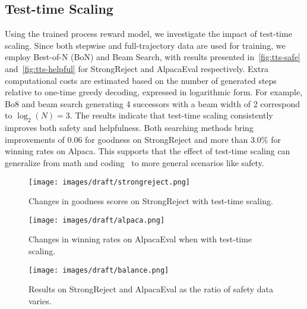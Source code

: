 \subsection{Test-time Scaling}

Using the trained process reward model, we investigate the impact of test-time scaling. Since both stepwise and full-trajectory data are used for training, we employ Best-of-N (BoN) and Beam Search, with results presented in~\cref{fig:tts-safe} and~\ref{fig:tts-helpful} for StrongReject and AlpacaEval respectively. Extra computational costs are estimated based on the number of generated steps relative to one-time greedy decoding, expressed in logarithmic form. For example, Bo8 and beam search generating 4 successors with a beam width of 2 correspond to $\log_2(N)=3$. The results indicate that test-time scaling consistently improves both safety and helpfulness. Both searching methods bring improvements of 0.06 for goodness on StrongReject and more than 3.0\% for winning rates on Alpaca.
This supports that the effect of test-time scaling can generalize from math and coding~\cite{snell2024scaling,xie2024self} to more general scenarios like safety.


\begin{figure*}[t]
     \centering
     \begin{minipage}{0.3\textwidth}
         \centering
         \texttt{[image: images/draft/strongreject.png]}
         \vspace{-4ex}
         \caption{Changes in goodness scores on StrongReject with test-time scaling.}
         \label{fig:tts-safe}
     \end{minipage}
     \hfill
     \begin{minipage}{0.3\textwidth}
         \centering
         \texttt{[image: images/draft/alpaca.png]}
         \vspace{-4ex}
         \caption{Changes in winning rates on AlpacaEval when with test-time scaling.}
         \label{fig:tts-helpful}
     \end{minipage}
     \hfill
     \begin{minipage}{0.3\textwidth}
         \centering
         \texttt{[image: images/draft/balance.png]}
         \vspace{-4ex}
         \caption{Results on StrongReject and AlpacaEval as the ratio of safety data varies.}
         \label{fig:data}
     \end{minipage}
    \vspace{-1ex}
\end{figure*}


